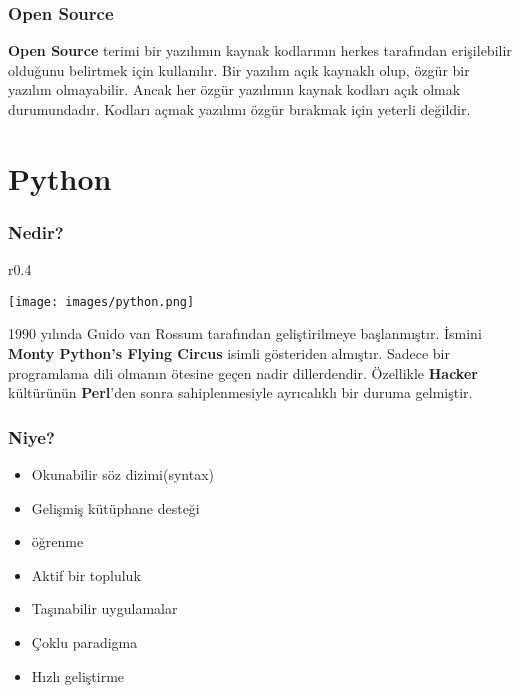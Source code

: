 \documentclass[10pt, compress]{beamer}
\begin{document}
\begin{frame}[fragile]
    \frametitle{Open Source}
    \textbf{Open Source} terimi bir yazılımın kaynak kodlarının herkes tarafından erişilebilir olduğunu belirtmek için kullanılır. Bir yazılım açık kaynaklı olup, özgür bir yazılım olmayabilir. Ancak her özgür yazılımın kaynak kodları açık olmak durumundadır. Kodları açmak yazılımı özgür bırakmak için yeterli değildir.
\end{frame}


\section{Python}
\begin{frame}[fragile]
    \frametitle{Nedir?}
    \begin{wrapfigure}{r}{0.4\textwidth}
    \vspace{-5em}
    \begin{center}
        \texttt{[image: images/python.png]}
    \end{center}
    \end{wrapfigure}       
    1990 yılında Guido van Rossum tarafından geliştirilmeye başlanmıştır. İsmini \textbf{Monty Python’s Flying Circus} isimli gösteriden almıştır. Sadece bir programlama dili olmanın ötesine geçen nadir dillerdendir. Özellikle \textbf{Hacker} kültürünün \textbf{Perl}'den sonra sahiplenmesiyle ayrıcalıklı bir duruma gelmiştir.
    
\end{frame}

\begin{frame}[fragile]
    \frametitle{Niye?}
    \begin{itemize}[<+- | alert@+>]
        \item Okunabilir söz dizimi(syntax)
        \item Gelişmiş kütüphane desteği
        \item \alert<8>{ öğrenme}
        \item Aktif bir topluluk
        \item Taşınabilir uygulamalar
        \item Çoklu paradigma
        \item Hızlı geliştirme
    \end{itemize}  
\end{frame}
\end{document}
